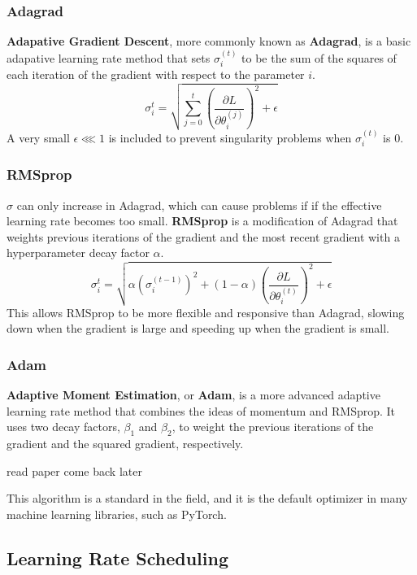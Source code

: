 \documentclass[12pt]{report}
\theoremstyle{definition}
\theoremstyle{remark}
\begin{document}
\subsubsection{Adagrad}
\textbf{Adapative Gradient Descent}, more commonly known as \textbf{Adagrad}, is a basic adapative learning rate method that sets $\sigma_i^{(t)}$ to be the sum of the squares of each iteration of the gradient with respect to the parameter $i$.
\begin{equation}
    \sigma_i^t = \sqrt{\sum_{j=0}^t {\left(\frac{\partial L}{\partial \theta_i^{(j)}}\right)}^2 + \epsilon}
\end{equation}
A very small $\epsilon \lll 1$ is included to prevent singularity problems when $\sigma_i^{(t)}$ is $0$.

\subsubsection{RMSprop}
$\sigma$ can only increase in Adagrad, which can cause problems if if the effective learning rate becomes too small. \textbf{RMSprop} is a modification of Adagrad that weights previous iterations of the gradient and the most recent gradient with a hyperparameter decay factor $\alpha$.
\begin{equation}
    \sigma_i^t = \sqrt{\alpha {(\sigma_i^{(t-1)})}^2 + (1-\alpha)\left(\frac{\partial L}{\partial \theta_i^{(t)}}\right)^2 + \epsilon}
\end{equation}
This allows RMSprop to be more flexible and responsive than Adagrad, slowing down when the gradient is large and speeding up when the gradient is small.
\subsubsection{Adam}
\textbf{Adaptive Moment Estimation}, or \textbf{Adam}, is a more advanced adaptive learning rate method that combines the ideas of momentum and RMSprop. It uses two decay factors, $\beta_1$ and $\beta_2$, to weight the previous iterations of the gradient and the squared gradient, respectively.

\cite{kingma_adam_2017}

read paper come back later

This algorithm is a standard in the field, and it is the default optimizer in many machine learning libraries, such as PyTorch.

\subsection{Learning Rate Scheduling}
\end{document}
